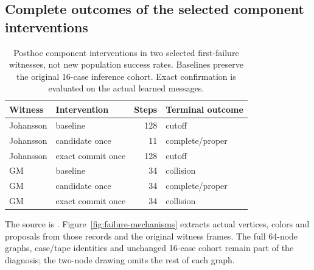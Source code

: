 \subsection{Complete outcomes of the selected component interventions}

\begin{table}[htbp]\centering\small
\begin{tabular}{llrl}
\toprule Witness & Intervention & Steps & Terminal outcome \\
\midrule
Johansson & baseline & 128 & cutoff \\
Johansson & candidate once & 11 & complete/proper \\
Johansson & exact commit once & 128 & cutoff \\
GM & baseline & 34 & collision \\
GM & candidate once & 34 & complete/proper \\
GM & exact commit once & 34 & collision \\
\bottomrule
\end{tabular}
\caption{Posthoc component interventions in two selected first-failure
witnesses, not new population success rates. Baselines preserve the original
16-case inference cohort. Exact confirmation is evaluated on the actual
learned messages.}
\label{tab:rescues}
\end{table}

The source is .
Figure~\ref{fig:failure-mechanisms} extracts actual vertices, colors and
proposals from those records and the original witness frames. The full
64-node graphs, case/tape identities and unchanged 16-case cohort remain
part of the diagnosis; the two-node drawing omits the rest of each graph.
